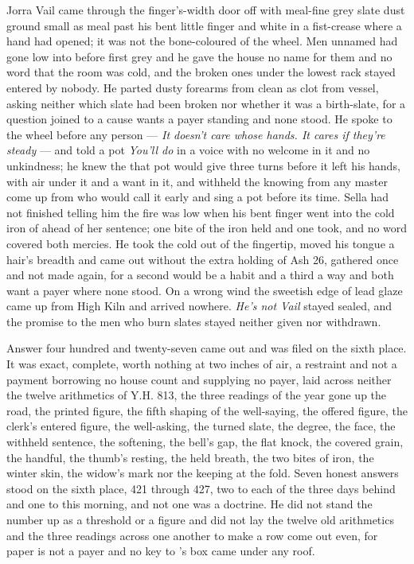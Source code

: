 Jorra Vail came through the finger's-width door off  with meal-fine grey slate dust ground small as meal past his bent little finger and white in a fist-crease where a hand had opened; it was not the bone-coloured  of the wheel. Men unnamed had gone low into  before first grey and he gave the house no name for them and no word that the room was cold, and the broken ones under the lowest rack stayed entered by nobody. He parted dusty forearms from clean as clot from vessel, asking neither which slate had been broken nor whether it was a birth-slate, for a question joined to a cause wants a payer standing and none stood. He spoke to the wheel before any person --- \emph{It doesn’t care whose hands. It cares if they’re steady} --- and told a pot \emph{You’ll do} in a voice with no welcome in it and no unkindness; he knew the  that pot would give three turns before it left his hands, with air under it and a want in it, and withheld the knowing from any master come up from  who would call it early and sing a pot before its time. Sella had not finished telling him the fire was low when his bent finger went into the cold iron of  ahead of her sentence; one bite of the iron held and one took, and no  word covered both mercies. He took the cold out of the fingertip, moved his tongue a hair’s breadth and came out without the extra holding of Ash 26, gathered once and not made again, for a second would be a habit and a third a way and both want a payer where none stood. On a wrong wind the sweetish edge of lead glaze came up from High Kiln and arrived nowhere. \emph{He’s not Vail} stayed sealed, and the promise to the men who burn slates stayed neither given nor withdrawn.

\scenebreak

Answer four hundred and twenty-seven came out and was filed on the sixth place. It was exact, complete, worth nothing at two inches of air, a restraint and not a payment borrowing no house count and supplying no payer, laid across neither the twelve arithmetics of Y.H. 813, the three readings of the year gone up the road, the printed figure, the fifth shaping of the well-saying, the offered figure, the clerk’s entered figure, the well-asking, the turned slate, the degree, the face, the withheld sentence, the softening, the bell’s gap, the flat knock, the covered grain, the handful, the thumb’s resting, the held breath, the two bites of iron, the winter skin, the widow’s mark nor the keeping at the fold. Seven honest answers stood on the sixth place, 421 through 427, two to each of the three days behind and one to this morning, and not one was a doctrine. He did not stand the number up as a threshold or a figure and did not lay the twelve old arithmetics and the three readings across one another to make a row come out even, for paper is not a payer and no key to 's box came under any roof.

